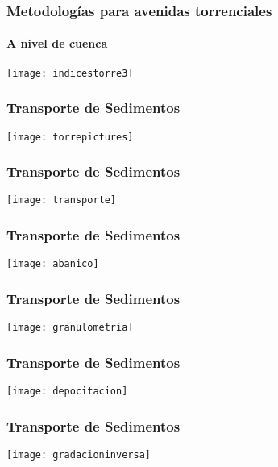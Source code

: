 \documentclass{beamer}
\begin{document}
\begin{frame}
\frametitle{Metodologías para avenidas torrenciales}
\framesubtitle{A nivel de cuenca}
\begin{center}
   	\texttt{[image: indicestorre3]}
\end{center}
\end{frame}
\begin{frame}
\frametitle{Transporte de Sedimentos}
\begin{center}
   	\texttt{[image: torrepictures]}
\end{center}
\end{frame}
\begin{frame}
\frametitle{Transporte de Sedimentos}
\begin{center}
   	\texttt{[image: transporte]}
\end{center}
\end{frame}
\begin{frame}
\frametitle{Transporte de Sedimentos}
\begin{center}
   	\texttt{[image: abanico]}
\end{center}
\end{frame}
\begin{frame}
\frametitle{Transporte de Sedimentos}
\begin{center}
   	\texttt{[image: granulometria]}
\end{center}
\end{frame}
\begin{frame}
\frametitle{Transporte de Sedimentos}
\begin{center}
   	\texttt{[image: depocitacion]}
\end{center}
\end{frame}
\begin{frame}
\frametitle{Transporte de Sedimentos}
\begin{center}
   	\texttt{[image: gradacioninversa]}
\end{center}
\end{frame}
\end{document}
